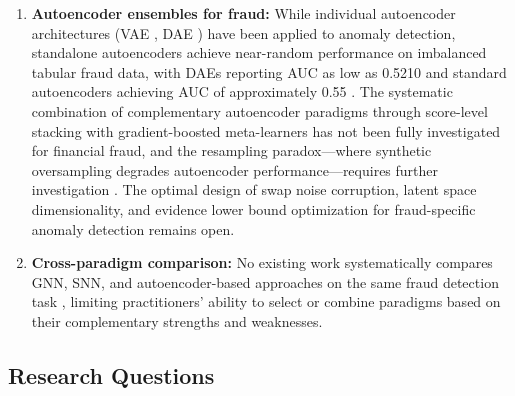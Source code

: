 \begin{enumerate}[label=\arabic*.]
\item \textbf{Autoencoder ensembles for fraud:} While individual autoencoder architectures (VAE \cite{kingma2014auto}, DAE \cite{vincent2010stacked}) have been applied to anomaly detection, standalone autoencoders achieve near-random performance on imbalanced tabular fraud data, with DAEs reporting AUC as low as 0.5210 \cite{dong2025enhanced} and standard autoencoders achieving AUC of approximately 0.55 \cite{obushyni2025vae}. The systematic combination of complementary autoencoder paradigms through score-level stacking with gradient-boosted meta-learners \cite{chen2016xgboost,ke2017lightgbm} has not been fully investigated for financial fraud, and the resampling paradox---where synthetic oversampling degrades autoencoder performance---requires further investigation \cite{dong2025enhanced}. The optimal design of swap noise corruption, latent space dimensionality, and evidence lower bound optimization \cite{farahat2025objective} for fraud-specific anomaly detection remains open.
\item \textbf{Cross-paradigm comparison:} No existing work systematically compares GNN, SNN, and autoencoder-based approaches on the same fraud detection task \cite{pourhabibi2022graph,cheng2024graph}, limiting practitioners' ability to select or combine paradigms based on their complementary strengths and weaknesses.
\end{enumerate}

\subsection{Research Questions}

